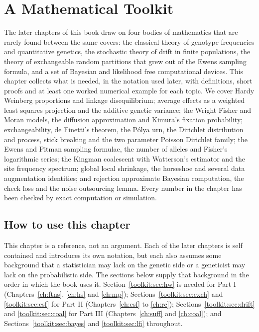 \DeclareRobustCommand{\PD}{\mathrm{PD}}
\DeclareRobustCommand{\GEM}{\mathrm{GEM}}
\DeclareRobustCommand{\Be}{\mathrm{Be}}
\DeclareRobustCommand{\Ga}{\mathrm{Ga}}
\DeclareRobustCommand{\Dir}{\mathrm{Dir}}
\DeclareRobustCommand{\PG}{\mathrm{PG}}
\DeclareRobustCommand{\DP}{\mathrm{DP}}
\DeclareRobustCommand{\Bin}{\mathrm{Bin}}
\DeclareRobustCommand{\Po}{\mathrm{Po}}
\DeclareRobustCommand{\one}{\mathbf{1}}
\chapter{A Mathematical Toolkit}\label{ch:toolkit}

\begin{chaptersummary}
The later chapters of this book draw on four bodies of mathematics that are rarely found between
the same covers: the classical theory of genotype frequencies and quantitative genetics, the
stochastic theory of drift in finite populations, the theory of exchangeable random partitions
that grew out of the Ewens sampling formula, and a set of Bayesian and likelihood free
computational devices. This chapter collects what is needed, in the notation used later, with
definitions, short proofs and at least one worked numerical example for each topic. We cover
Hardy Weinberg proportions and linkage disequilibrium; average effects as a weighted least
squares projection and the additive genetic variance; the Wright Fisher and Moran models, the
diffusion approximation and Kimura's fixation probability; exchangeability, de Finetti's
theorem, the P\'olya urn, the Dirichlet distribution and process, stick breaking and the two
parameter Poisson Dirichlet family; the Ewens and Pitman sampling formulae, the number of alleles
and Fisher's logarithmic series; the Kingman coalescent with Watterson's estimator and the site
frequency spectrum; global local shrinkage, the horseshoe and several data augmentation
identities; and rejection approximate Bayesian computation, the check loss and the noise
outsourcing lemma. Every number in the chapter has been checked by exact computation or
simulation.
\end{chaptersummary}

\section{How to use this chapter}\label{toolkit:sec:use}

This chapter is a reference, not an argument. Each of the later chapters is self contained and
introduces its own notation, but each also assumes some background that a statistician may lack
on the genetic side or a geneticist may lack on the probabilistic side. The sections below supply
that background in the order in which the book uses it.
Section~\ref{toolkit:sec:hw} is needed for Part I (Chapters~\ref{ch:ftns}, \ref{ch:hs} and
\ref{ch:mp}); Sections~\ref{toolkit:sec:exch} and \ref{toolkit:sec:esf} for Part II
(Chapters~\ref{ch:esf} to \ref{ch:rc}); Sections~\ref{toolkit:sec:drift} and
\ref{toolkit:sec:coal} for Part III (Chapters~\ref{ch:suff} and \ref{ch:coal}); and
Sections~\ref{toolkit:sec:bayes} and \ref{toolkit:sec:lfi} throughout.

